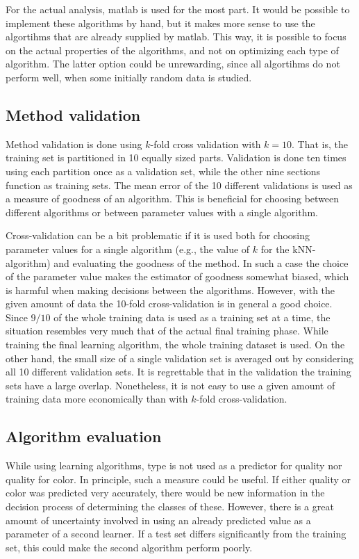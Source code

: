 \documentclass[twoside]{article}
\begin{document}
\begin{multicols}{2}
For the actual analysis, matlab is used for the most part. It would be possible to implement these algorithms by hand,
but it makes more sense to use the algortihms that are already supplied by matlab. This way, it is possible to focus
on the actual properties of the algorithms, and not on optimizing each type of algorithm. The latter option could be
unrewarding, since all algortihms do not perform well, when some initially random data is studied.

\subsection{Method validation}

Method validation is done using $k$-fold cross validation with $k = 10$. That is, the training set is partitioned in 10 equally sized parts. 
Validation is done ten times using each partition once as a validation set, while the other nine
sections function as training sets. The mean error of the 10 different validations is used as a measure
of goodness of an algorithm. This is beneficial for choosing between different algorithms or
between parameter values with a single algorithm.

Cross-validation can be a bit problematic if it is used both for choosing parameter values for a single algorithm (e.g., the value of $k$
for the kNN-algorithm) and evaluating the goodness of the method. In such a case the choice of the parameter value makes the estimator
of goodness somewhat biased, which is harmful when making decisions between the algorithms. However, with the given amount of data
the 10-fold cross-validation is in general a good choice. Since $9/10$ of the whole training data is used as a training set at a time,
the situation resembles very much that of the actual final training phase. While training the final learning algorithm, the whole training dataset
is used. On the other hand, the small size of a single validation set is averaged out by considering all 10 different validation sets.
It is regrettable that in the validation the training sets have a large overlap. Nonetheless, it is not easy to use a given amount
of training data more economically than with $k$-fold cross-validation.

\subsection{Algorithm evaluation}

While using learning algorithms, type is not used as a predictor for quality nor quality for color.
In principle, such a measure could be useful. If either quality or color was predicted very
accurately, there would be new information in the decision process of determining the classes of these.
However, there is a great amount of uncertainty involved in using an already predicted value as a
parameter of a second learner. If a test set differs significantly from the training set, this could
make the second algorithm perform poorly.


\end{multicols}
\end{document}
